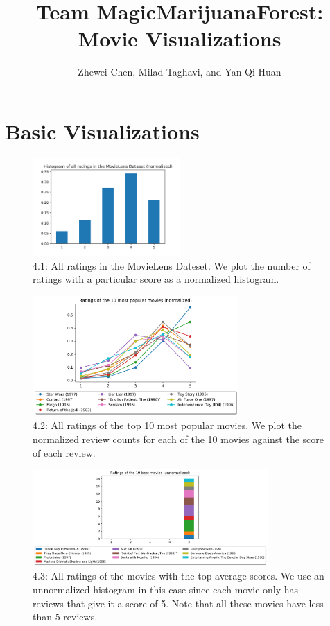 \documentclass{article}
\title{Team MagicMarijuanaForest: Movie Visualizations}
\author{Zhewei Chen, Milad Taghavi, and Yan Qi Huan}
\begin{document}
	\maketitle

	\section{Basic Visualizations}
		\begin{figure}[H]
			\centering
			\includegraphics[width=0.5\textwidth]{Fig4-1.png}
			\caption{4.1: All ratings in the MovieLens Dateset. We plot the number of ratings with a particular score as a normalized histogram.}
		\end{figure}
	
	\begin{figure}[H]
		\centering
		\includegraphics[width=0.7\textwidth]{Fig4-2.png}
		\caption{4.2: All ratings of the top 10 most popular movies. We plot the normalized review counts for each of the 10 movies against the score of each review.}
	\end{figure}

	\begin{figure}[H]
	\centering
	\includegraphics[width=0.8\textwidth]{Fig4-3.png}
	\caption{4.3: All ratings of the movies with the top average scores. We use an unnormalized histogram in this case since each movie only has reviews that give it a score of 5. Note that all these movies have less than 5 reviews.}
	\end{figure}
\end{document}
